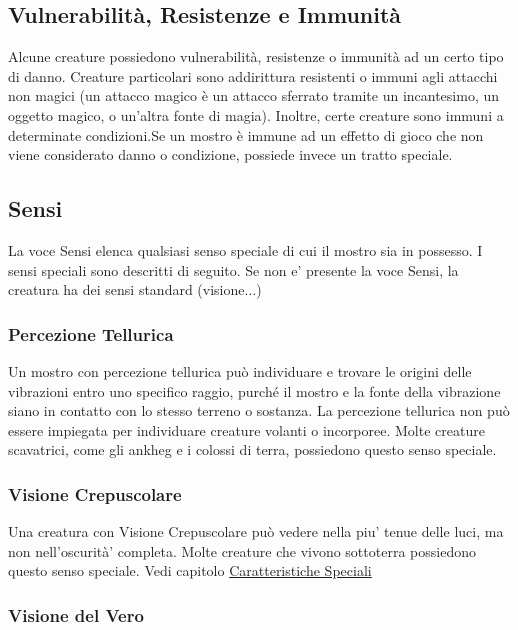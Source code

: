 \subsection{Vulnerabilità, Resistenze e Immunità}

Alcune creature possiedono vulnerabilità, resistenze o immunità ad un certo tipo di danno. Creature particolari sono addirittura resistenti o immuni agli attacchi non magici (un attacco magico è un attacco sferrato tramite un incantesimo, un oggetto magico, o un'altra fonte di magia). Inoltre, certe creature sono immuni a determinate condizioni.Se  un mostro è immune ad un effetto di gioco che non viene considerato danno o condizione, possiede invece un tratto speciale.

\subsection{Sensi}

La voce Sensi elenca qualsiasi senso speciale di cui il mostro sia in possesso. I sensi speciali sono descritti di seguito. Se non e' presente la voce Sensi, la creatura ha dei sensi standard (visione...)

\subsubsection{Percezione Tellurica}

Un mostro con percezione tellurica può individuare e trovare le origini delle vibrazioni entro uno specifico raggio, purché il mostro e la fonte della vibrazione siano in contatto con lo stesso terreno o sostanza. La percezione tellurica non può essere impiegata per individuare creature volanti o incorporee. Molte creature scavatrici, come gli ankheg e i colossi di terra, possiedono questo senso speciale.

\subsubsection{Visione Crepuscolare}

Una creatura con Visione Crepuscolare può vedere nella piu' tenue delle luci, ma non nell'oscurità' completa. Molte creature che vivono sottoterra possiedono questo senso
speciale.  Vedi capitolo \hyperref[sec:sec:visione-e-luce]{Caratteristiche Speciali}

\subsubsection{Visione del Vero}

